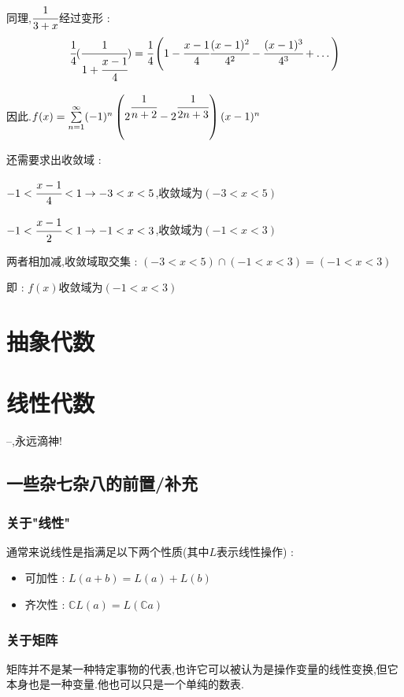 \documentclass[UTF8,12pt]{ctexbook}
\newcommand{\upDownSum}[2]{\sum\limits_{#2}^{#1}}
\newcommand{\defFunction}[1]{f(#1)}
\newcommand{\mathConstant}{\mathbb{C}}
\newcommand{\bigCase}[1]{\left(#1\right)}
\newcommand{\sumSeries}{\upDownSum{\infty}{n = 1}}
\DeclareMathOperator{\intersectionSet}{\cap}
\begin{document}
{{{{{\begin{enumerate}
{            同理,$\cfrac{1}{3 + x}$经过变形 :
            $$
              \cfrac{1}{4}(\cfrac{1}{1 + \cfrac{x - 1}{4}}) = \cfrac{1}{4}\bigCase{1 - \cfrac{x - 1}{4} \cfrac{(x - 1)^2}{4^2} - \cfrac{(x - 1)^3}{4^3} + \dots}
            $$

            因此.$\defFunction{x} = \sumSeries(-1)^n\bigCase{2^{\cfrac{1}{n + 2}} - 2^{\cfrac{1}{2n + 3}}}(x - 1)^n$

            还需要求出收敛域 :

            $-1 < \cfrac{x - 1}{4} < 1 \to -3 < x < 5$,收敛域为$(-3 < x < 5)$

            $-1 < \cfrac{x - 1}{2} < 1 \to -1 < x < 3$,收敛域为$(-1 < x < 3)$

            两者相加减,收敛域取交集 : $(-3 < x < 5) \intersectionSet (-1 < x < 3) = (-1 < x < 3)$

            即 : $\defFunction{x}$收敛域为$(-1 < x < 3)$
            }
    \end{enumerate}
  }%

}%

}%

\section{抽象代数}{}%

\section{线性代数}{
--{,永远滴神!}

\subsection{一些杂七杂八的前置/补充}{

  \subsubsection{关于"线性"}{
    通常来说线性是指满足以下两个性质(其中$L$表示线性操作) :
    \begin{itemize}
      \item 可加性 : $L(a + b) = L(a) + L(b)$
      \item 齐次性 : $\mathConstant L(a) = L(\mathConstant a)$
    \end{itemize}
  }%

  \subsubsection{关于矩阵}{
    矩阵并不是某一种特定事物的代表,也许它可以被认为是操作变量的线性变换,但它本身也是一种变量.他也可以只是一个单纯的数表.

}}}}}
\end{document}
